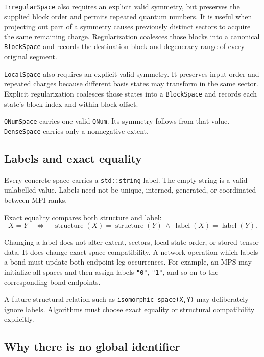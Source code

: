 \documentclass[11pt]{article}
\begin{document}
\texttt{IrregularSpace} also requires an explicit valid symmetry, but
preserves the supplied block order and permits repeated quantum
numbers.  It is useful when projecting out part of a symmetry causes
previously distinct sectors to acquire the same remaining charge.
Regularization coalesces those blocks into a canonical
\texttt{BlockSpace} and records the destination block and degeneracy
range of every original segment.

\texttt{LocalSpace} also requires an explicit valid symmetry.  It
preserves input order and repeated charges because different basis
states may transform in the same sector.  Explicit regularization
coalesces those states into a \texttt{BlockSpace} and records each
state's block index and within-block offset.

\texttt{QNumSpace} carries one valid \texttt{QNum}.  Its symmetry
follows from that value.  \texttt{DenseSpace} carries only a
nonnegative extent.

\subsection{Labels and exact equality}

Every concrete space carries a \texttt{std::string} label.  The empty
string is a valid unlabelled value.  Labels need not be unique,
interned, generated, or coordinated between MPI ranks.

Exact equality compares both structure and label:
\[
  X = Y
  \quad\Longleftrightarrow\quad
  \operatorname{structure}(X)=\operatorname{structure}(Y)
  \ \land\
  \operatorname{label}(X)=\operatorname{label}(Y).
\]

Changing a label does not alter extent, sectors, local-state order, or
stored tensor data.  It does change exact space compatibility.  A
network operation which labels a bond must update both endpoint leg
occurrences.  For example, an MPS may initialize all spaces and then
assign labels \texttt{"0"}, \texttt{"1"}, and so on to the
corresponding bond endpoints.

A future structural relation such as
\texttt{isomorphic\_space(X,Y)} may deliberately ignore labels.
Algorithms must choose exact equality or structural compatibility
explicitly.

\subsection{Why there is no global identifier}
\end{document}
